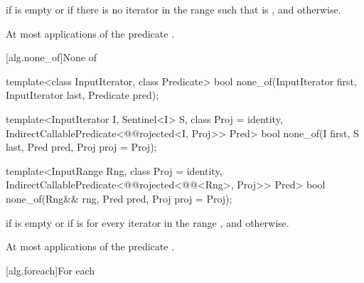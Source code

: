 \begin{itemdescr}
\pnum
\returns {} if  is empty or
if there is no iterator  in the range
 such that
is , and  otherwise.

\pnum
\complexity At most  applications of the predicate
.
\end{itemdescr}

[alg.none_of]{None of}

%
\begin{removedblock}
\begin{itemdecl}
template<class InputIterator, class Predicate>
  bool none_of(InputIterator first, InputIterator last, Predicate pred);
\end{itemdecl}
\end{removedblock}
\begin{addedblock}
\begin{itemdecl}
template<InputIterator I, Sentinel<I> S, class Proj = identity,
    IndirectCallablePredicate<@@rojected<I, Proj>> Pred>
  bool none_of(I first, S last, Pred pred, Proj proj = Proj{});

template<InputRange Rng, class Proj = identity,
    IndirectCallablePredicate<@@rojected<@@<Rng>, Proj>> Pred>
  bool none_of(Rng&& rng, Pred pred, Proj proj = Proj{});
\end{itemdecl}
\end{addedblock}

\begin{itemdescr}
\pnum
\returns {} if
 is empty or if
is  for every iterator  in the range ,
and  otherwise.

\pnum
\complexity At most  applications of the predicate
.
\end{itemdescr}

[alg.foreach]{For each}

